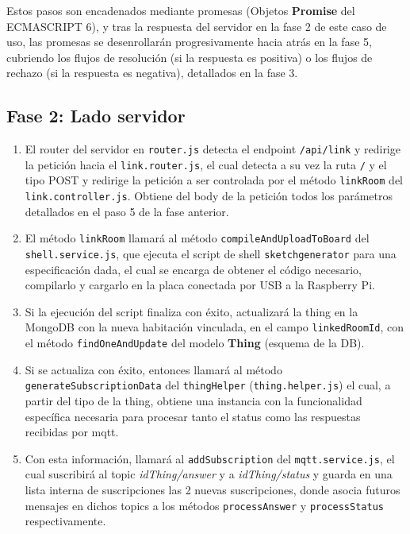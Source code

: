 Estos pasos son encadenados mediante promesas (Objetos \textbf{Promise} del ECMASCRIPT 6), y tras la respuesta del servidor en la fase 2 de este caso de uso, las promesas se desenrollarán progresivamente hacia atrás en la fase 5, cubriendo los flujos de resolución (si la respuesta es positiva) o los flujos de rechazo (si la respuesta es negativa), detallados en la fase 3.

\subsection{Fase 2: Lado servidor}
\label{ch:Capitulo5.2.2}
\begin{enumerate}
\item  El router del servidor en \verb|router.js| detecta el endpoint \verb|/api/link| y redirige la petición hacia el \verb|link.router.js|, el cual detecta a su vez la ruta \verb|/| y el tipo POST y redirige la petición a ser controlada por el método \verb|linkRoom| del \verb|link.controller.js|. Obtiene del body de la petición todos los parámetros detallados en el paso 5 de la fase anterior.

\item  El método \verb|linkRoom| llamará al método \verb|compileAndUploadToBoard| del \verb|shell.service.js|, que ejecuta el script de shell \verb|sketchgenerator| para una especificación dada, el cual se encarga de obtener el código necesario, compilarlo y cargarlo en la placa conectada por USB a la Raspberry Pi.

\item  Si la ejecución del script finaliza con éxito, actualizará la thing en la MongoDB con la nueva habitación vinculada, en el campo \verb|linkedRoomId|, con el método \verb|findOneAndUpdate| del modelo \textbf{Thing} (esquema de la DB).

\item  Si se actualiza con éxito, entonces llamará al método \verb|generateSubscriptionData| del \verb|thingHelper| (\verb|thing.helper.js|) el cual, a partir del tipo de la thing, obtiene una instancia con la funcionalidad específica necesaria para procesar tanto el status como las respuestas recibidas por \gls{mqtt}.

\item  Con esta información, llamará al \verb|addSubscription| del \verb|mqtt.service.js|, el cual suscribirá al topic \textit{idThing/answer} y a \textit{idThing/status} y guarda en una lista interna de suscripciones las 2 nuevas suscripciones, donde asocia futuros mensajes en dichos topics a los métodos \verb|processAnswer| y \verb|processStatus| respectivamente.


\end{enumerate}
